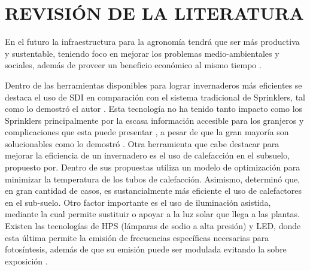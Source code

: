\documentclass[letterpaper,conference]{IEEEtran}
\begin{document}
\section{REVISIÓN DE LA LITERATURA}





En el futuro la infraestructura para la agronomía tendrá que ser más productiva y sustentable, teniendo foco en mejorar los problemas medio-ambientales y sociales, además de proveer un beneficio económico al mismo tiempo \parencite{Specht2014}.



Dentro de las herramientas disponibles para lograr invernaderos más eficientes se destaca el uso de SDI en comparación con el sistema tradicional de Sprinklers, tal como lo demostró el autor \parencite{Of2000}. Esta tecnología no ha tenido tanto impacto como los Sprinklers principalmente por la escasa información accesible para los granjeros y complicaciones que esta puede presentar \parencite{Lamm2012}, a pesar de que la gran mayoría son solucionables como lo demostró \parencite{Yu2010}. 
Otra herramienta que cabe destacar para mejorar la eficiencia de un invernadero es el uso de calefacción en el subsuelo, propuesto por\parencite{Cuce2016}. Dentro de sus propuestas utiliza un modelo de optimización para minimizar la temperatura de los tubos de calefacción. Asimismo, \parencite{Kurpaska2000} determinó que, en gran cantidad de casos, es sustancialmente más eficiente el uso de calefactores en el sub-suelo. 
Otro factor importante es el uso de iluminación asistida, mediante la cual permite sustituir o apoyar a la luz solar que llega a las plantas. Existen las tecnologías de HPS (lámparas de sodio a alta presión) y LED, donde esta última permite la emisión de frecuencias específicas necesarias para fotosíntesis, además de que su emisión puede ser modulada evitando la sobre exposición \parencite{VanIersel2017}.
\end{document}
